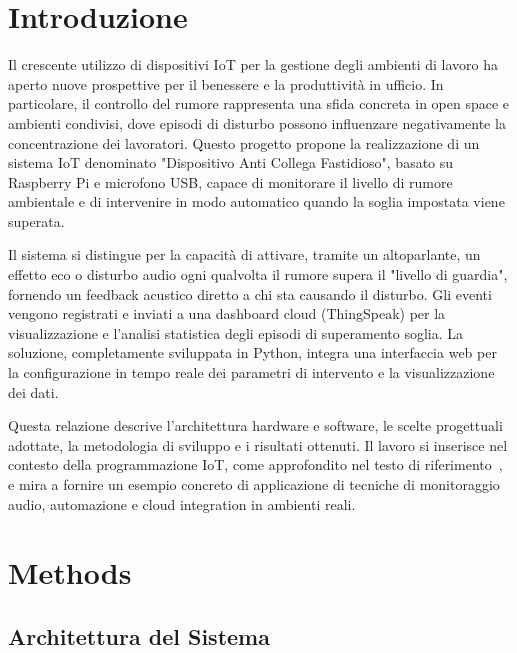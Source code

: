 
\section*{Introduzione}

Il crescente utilizzo di dispositivi IoT per la gestione degli ambienti di lavoro ha aperto nuove prospettive per il benessere e la produttività in ufficio. In particolare, il controllo del rumore rappresenta una sfida concreta in open space e ambienti condivisi, dove episodi di disturbo possono influenzare negativamente la concentrazione dei lavoratori. Questo progetto propone la realizzazione di un sistema IoT denominato "Dispositivo Anti Collega Fastidioso", basato su Raspberry Pi e microfono USB, capace di monitorare il livello di rumore ambientale e di intervenire in modo automatico quando la soglia impostata viene superata.

Il sistema si distingue per la capacità di attivare, tramite un altoparlante, un effetto eco o disturbo audio ogni qualvolta il rumore supera il "livello di guardia", fornendo un feedback acustico diretto a chi sta causando il disturbo. Gli eventi vengono registrati e inviati a una dashboard cloud (ThingSpeak) per la visualizzazione e l’analisi statistica degli episodi di superamento soglia. La soluzione, completamente sviluppata in Python, integra una interfaccia web per la configurazione in tempo reale dei parametri di intervento e la visualizzazione dei dati.

Questa relazione descrive l’architettura hardware e software, le scelte progettuali adottate, la metodologia di sviluppo e i risultati ottenuti. Il lavoro si inserisce nel contesto della programmazione IoT, come approfondito nel testo di riferimento~\cite{milenkovic2020internet}, e mira a fornire un esempio concreto di applicazione di tecniche di monitoraggio audio, automazione e cloud integration in ambienti reali.


\section{Methods}

\subsection{Architettura del Sistema}

